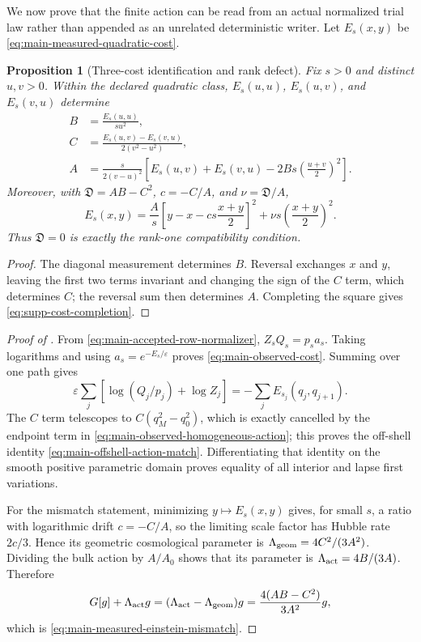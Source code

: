 \documentclass[11pt]{article}
\newtheorem{proposition}[proposition]{Proposition}
\theoremstyle{definition}
\theoremstyle{remark}
\begin{document}
We now prove that the finite action can be read from an actual normalized trial
law rather than appended as an unrelated deterministic writer.  Let
$E_s(x,y)$ be \eqref{eq:main-measured-quadratic-cost}.

\begin{proposition}[Three-cost identification and rank defect]
\label{prop:supp-three-costs}
Fix $s>0$ and distinct $u,v>0$.  Within the declared quadratic class,
$E_s(u,u)$, $E_s(u,v)$, and $E_s(v,u)$ determine
\begin{align}
 B&=\frac{E_s(u,u)}{su^2},\\
 C&=\frac{E_s(u,v)-E_s(v,u)}{2(v^2-u^2)},\\
 A&=\frac{s}{2(v-u)^2}\left[
 E_s(u,v)+E_s(v,u)
 -2Bs\left(\frac{u+v}{2}\right)^2\right].
 \label{eq:supp-three-cost-identification}
\end{align}
Moreover, with $\mathfrak D=AB-C^2$, $c=-C/A$, and
$\nu=\mathfrak D/A$,
\begin{equation}
 \boxed{
 E_s(x,y)=\frac A s\left[y-x-cs\frac{x+y}{2}\right]^2
 +\nu s\left(\frac{x+y}{2}\right)^2.}
 \label{eq:supp-cost-completion}
\end{equation}
Thus $\mathfrak D=0$ is exactly the rank-one compatibility condition.
\end{proposition}

\begin{proof}
The diagonal measurement determines $B$.  Reversal exchanges $x$ and $y$,
leaving the first two terms invariant and changing the sign of the $C$ term,
which determines $C$; the reversal sum then determines $A$.  Completing the
square gives \eqref{eq:supp-cost-completion}.
\end{proof}

\begin{proof}[Proof of ]
From \eqref{eq:main-accepted-row-normalizer},
$Z_sQ_s=p_sa_s$.  Taking logarithms and using
$a_s=e^{-E_s/\varepsilon}$ proves \eqref{eq:main-observed-cost}.  Summing over
one path gives
\[
 \varepsilon\sum_j\left[\log(Q_j/p_j)+\log Z_j\right]
 =-\sum_jE_{s_j}(q_j,q_{j+1}).
\]
The $C$ term telescopes to $C(q_M^2-q_0^2)$, which is exactly cancelled by the
endpoint term in \eqref{eq:main-observed-homogeneous-action}; this proves the
off-shell identity \eqref{eq:main-offshell-action-match}.  Differentiating that
identity on the smooth positive parametric domain proves equality of all
interior and lapse first variations.

For the mismatch statement, minimizing $y\mapsto E_s(x,y)$ gives, for small
$s$, a ratio with logarithmic drift $c=-C/A$, so the limiting scale factor has
Hubble rate $2c/3$.  Hence its geometric cosmological parameter is
$\Lambda_{\rm geom}=4C^2/(3A^2)$.  Dividing the bulk action by $A/A_0$ shows
that its parameter is $\Lambda_{\rm act}=4B/(3A)$.  Therefore
\[
 G[g]+\Lambda_{\rm act}g
 =(\Lambda_{\rm act}-\Lambda_{\rm geom})g
 =\frac{4(AB-C^2)}{3A^2}g,
\]
which is \eqref{eq:main-measured-einstein-mismatch}.
\end{proof}
\end{document}
